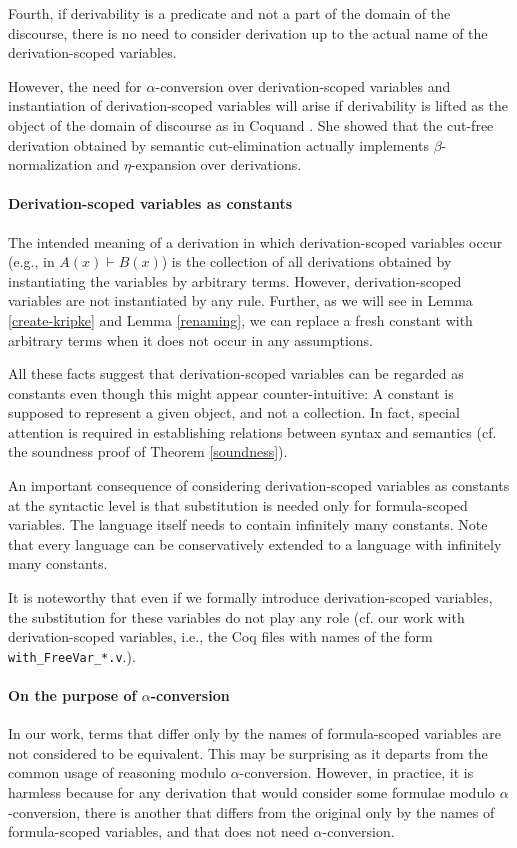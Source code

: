 \documentclass{svjour3}                     %
\begin{document}
Fourth, if derivability is a predicate and not a part of the domain of the discourse, there is no need to consider derivation up to the actual name of the derivation-scoped variables.

However, the need for $\alpha$-conversion over derivation-scoped variables and instantiation of derivation-scoped variables will arise if derivability is lifted as the object of the domain of discourse as in Coquand \cite{cCoquand93,cCoquand02}. She showed that the cut-free derivation obtained by semantic cut-elimination actually implements $\beta$-normalization and $\eta$-expansion over derivations.

\paragraph{Derivation-scoped variables as constants}
The intended meaning of a derivation in which derivation-scoped
variables occur (e.g., in $A(x) \vdash B(x)$) is the collection
of all derivations obtained by instantiating the variables by
arbitrary terms. However, derivation-scoped variables
are not instantiated by any rule.
Further, as we will see in Lemma \ref{create-kripke} and Lemma \ref{renaming}, we can replace a fresh constant with arbitrary terms when it does not occur in any assumptions. 

All these facts suggest that derivation-scoped variables can be regarded as constants even though this might appear counter-intuitive: A constant is supposed to represent a given object, and not a collection. In fact, special attention is required in establishing relations between syntax and semantics (cf. the soundness proof of Theorem \ref{soundness}).

An important consequence of considering derivation-scoped variables as constants at the syntactic level is that substitution is needed only for formula-scoped variables. The language itself needs to contain infinitely many constants. Note that every language can be conservatively extended to a language with infinitely many constants.

It is noteworthy that even if we formally introduce derivation-scoped variables, the substitution for these variables do not play any role (cf. our work with derivation-scoped variables, i.e., the Coq files with names of the form \verb|with_FreeVar_*.v|.).


\paragraph{On the purpose of $\alpha$-conversion}
In our work, terms that differ only by the names of formula-scoped variables are not considered to be equivalent. This may be surprising as it departs from the common usage of reasoning modulo $\alpha$-conversion. However, in practice, it is harmless because for any derivation that would consider some formulae modulo $\alpha$-conversion, there is another that differs from the original only by the names of formula-scoped variables, and that does not need $\alpha$-conversion.
\end{document}
